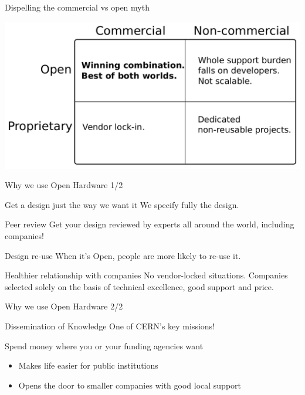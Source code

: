 \documentclass[compress, red]{beamer}
\begin{document}
\begin{frame}{Dispelling the commercial vs open myth}
 \begin{center}
   \includegraphics[width=\textwidth]{../../figures/ohwr/commercial_and_open.pdf}
 \end{center} 
\end{frame}

\begin{frame}{Why we use Open Hardware 1/2}
\pause
	\begin{block}{Get a design just the way we want it}
We specify fully the design.
	\end{block}	
\pause
	\begin{block}{Peer review}
	 Get your design reviewed by experts all around the world, including companies!
	\end{block}
\pause
\begin{block}{Design re-use}
  When it's Open, people are more likely to re-use it.
	\end{block}
\pause
	\begin{block}{Healthier relationship with companies}
          No vendor-locked situations. Companies selected solely on the basis of technical excellence, good support and price.
	\end{block}
\end{frame}

\begin{frame}{Why we use Open Hardware 2/2}
\pause
\begin{block}{Dissemination of Knowledge}
 One of CERN's key missions!
\end{block}
\pause
\begin{block}{Spend money where you or your funding agencies want}
 \begin{itemize}
   \item Makes life easier for public institutions
   \item Opens the door to smaller companies with good local support
  \end{itemize}
\end{block}	

\end{frame}
\end{document}
